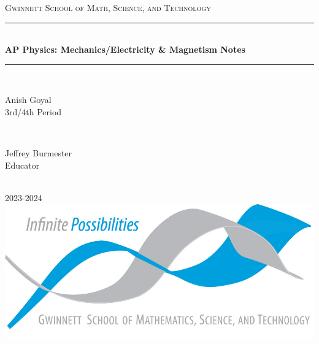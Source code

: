 \begin{titlepage}

    \newcommand{\HRule}{\rule{\linewidth}{0.5mm}}
    
    \center
    
    \vspace{10cm}

    \textsc{\LARGE Gwinnett School of Math, Science, and Technology }\\[0.3cm]
    
    \vspace{0.5cm}

    \HRule \\[0.4cm]
    { \huge \bfseries AP Physics: Mechanics/Electricity \& Magnetism Notes}\\[0.03cm]
    \HRule \\[1.5cm]
    
    \begin{minipage}{0.4\textwidth}
    \begin{flushleft} \Large
    Anish Goyal \\3rd/4th Period
    \end{flushleft}
    \end{minipage}
    ~
    \begin{minipage}{0.4\textwidth}
    \begin{flushright} \Large
    Jeffrey Burmester\\Educator
    \end{flushright}
    \end{minipage}\\[1cm]
    
    {\huge 2023-2024}\\[1cm]
    
    \includegraphics{img/logo.png}\\
    \vfill
    \end{titlepage}